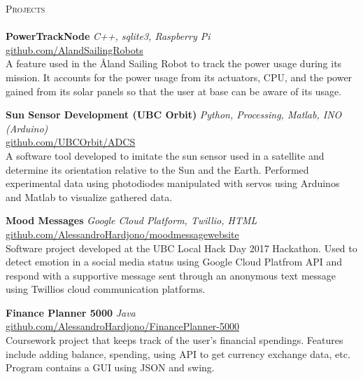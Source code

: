\documentclass[a4paper]{article}
\newcommand{\lineunder} {
    \vspace*{-8pt} \\
    \hspace*{-18pt} \hrulefill \\
}
\newcommand{\header} [1] {
    {\hspace*{-18pt}\vspace*{6pt} \textsc{#1}}
    \vspace*{-6pt} \lineunder
}
\begin{document}
\header{Projects}
{\textbf{PowerTrackNode}} {\sl C++, sqlite3, Raspberry Pi} \\  \href {https://github.com/AlandSailingRobots}{github.com/AlandSailingRobots}\\
A feature used in the Åland Sailing Robot to track the power usage during its mission. It accounts for the power usage from its actuators, CPU, and the power gained from its solar panels so that the user at base can be aware of its usage.\\
\vspace*{2mm}

{\textbf{Sun Sensor Development (UBC Orbit)}} {\sl Python, Processing, Matlab, INO (Arduino)} \\
\href{https://github.com/UBCOrbit/ADCS}{github.com/UBCOrbit/ADCS} \\
A software tool developed to imitate the sun sensor used in a satellite and determine its orientation relative to the Sun and the Earth. Performed experimental data using photodiodes manipulated with servos using Arduinos and Matlab to visualize gathered data.\\
\vspace*{2mm}

{\textbf{Mood Messages}} {\sl Google Cloud Platform, Twillio, HTML} \\ \href{https://github.com/AlessandroHardjono/moodmessagewebsite}{github.com/AlessandroHardjono/moodmessagewebsite}\\
Software project developed at the UBC Local Hack Day 2017 Hackathon. Used to detect emotion in a social media status using Google Cloud Platfrom API and respond with a supportive message sent through an anonymous text message using Twillio\textquotesingle{}s cloud communication platforms.\\
\vspace*{2mm}

{\textbf{Finance Planner 5000}} {\sl Java}\hfill \\
\href{https://github.com/AlessandroHardjono/FinancePlanner-5000}{github.com/AlessandroHardjono/FinancePlanner-5000}\\
Coursework project that keeps track of the user's financial spendings. Features include adding balance, spending, using API to get currency exchange data, etc. Program contains a GUI using JSON and swing.\\
\vspace*{2mm}



\ 
\end{document}
